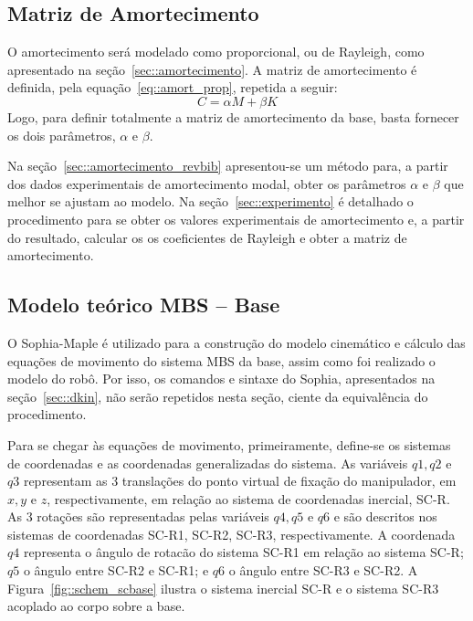 \subsection{Matriz de Amortecimento}

O amortecimento será modelado como proporcional, ou de Rayleigh, como
apresentado na seção~\ref{sec::amortecimento}. A matriz de amortecimento é
definida, pela equação~\ref{eq::amort_prop}, repetida a seguir:
%
\begin{equation*}
	C = \alpha M + \beta K
\end{equation*}
%
Logo, para definir totalmente a matriz de amortecimento da base, basta fornecer
os dois parâmetros, $\alpha$ e $\beta$.

Na seção~\ref{sec::amortecimento_revbib} apresentou-se um método para, a partir dos dados
experimentais de amortecimento modal, obter os parâmetros $\alpha$ e $\beta$ que
melhor se ajustam ao modelo. Na seção~\ref{sec::experimento} é
detalhado o procedimento para se obter os valores experimentais de amortecimento
e, a partir do resultado, calcular os os coeficientes de Rayleigh e obter a
matriz de amortecimento.



\subsection{Modelo teórico MBS -- Base}

O Sophia-Maple é utilizado para a construção do modelo cinemático e
cálculo das equações de movimento do sistema MBS da base, assim como foi
realizado o modelo do robô. Por isso, os comandos e sintaxe do Sophia,
apresentados na seção~\ref{sec::dkin}, não serão repetidos nesta seção, ciente
da equivalência do procedimento.

Para se chegar às equações de movimento, primeiramente, define-se os sistemas de
coordenadas e as coordenadas generalizadas do sistema.
As variáveis $q1, q2$ e $q3$ representam as 3 translações do ponto virtual de
fixação do manipulador, em $x,y$ e $z$, respectivamente, em relação ao sistema de
coordenadas inercial, SC-R. As 3 rotações são representadas pelas variáveis
$q4, q5$ e $q6$ e são descritos nos sistemas de coordenadas SC-R1, SC-R2,
SC-R3, respectivamente.
A coordenada $q4$ representa o ângulo de rotacão do sistema SC-R1
em relação ao sistema SC-R; $q5$ o ângulo entre SC-R2 e SC-R1; e $q6$ o ângulo
entre SC-R3 e SC-R2. A Figura~\ref{fig::schem_scbase} ilustra o sistema inercial
SC-R e o sistema SC-R3 acoplado ao corpo sobre a base.

